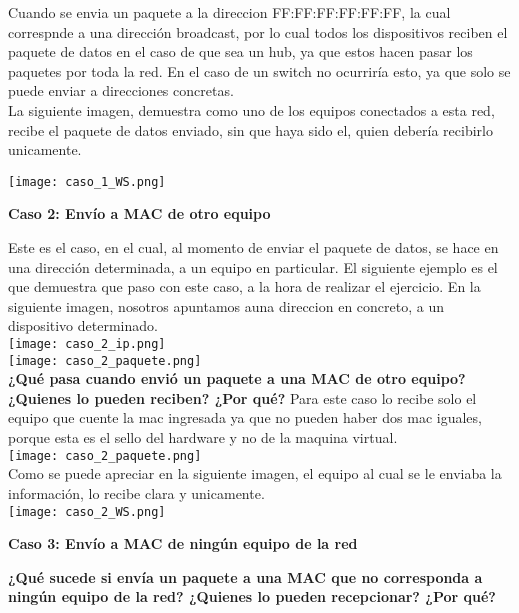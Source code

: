 \documentclass{article}
\begin{document}
Cuando se envia un paquete a la direccion  FF:FF:FF:FF:FF:FF, la cual correspnde a una dirección broadcast, por lo cual todos los dispositivos reciben el paquete de datos en el caso de que sea un hub, ya que estos hacen pasar los paquetes por toda la red. En el caso de un switch no ocurriría esto, ya que solo se puede enviar a direcciones concretas. \\
La siguiente imagen, demuestra como uno de los equipos conectados a esta red, recibe el paquete de datos enviado, sin que haya sido el, quien debería recibirlo unicamente.

\texttt{[image: caso\_1\_WS.png]}
\newpage
\begin{center}
{\LARGE \bfseries Caso 2: Envío a MAC de otro equipo }
\end{center}
Este es el caso, en el cual, al momento de enviar el paquete de datos, se hace en una dirección determinada, a un equipo en particular. El siguiente ejemplo es el que demuestra que paso con este caso, a la hora de realizar el ejercicio. En la siguiente imagen, nosotros apuntamos auna direccion en concreto, a un dispositivo determinado.\\
\texttt{[image: caso\_2\_ip.png]}
\\ 
\texttt{[image: caso\_2\_paquete.png]}
\\
\textbf{¿Qué pasa cuando envió un paquete a una MAC de otro equipo? ¿Quienes lo
pueden reciben? ¿Por qué?}
Para este caso lo recibe solo el equipo que cuente la mac ingresada ya que no pueden haber dos mac iguales, porque esta es el sello del hardware y no de la maquina virtual. \\

\texttt{[image: caso\_2\_paquete.png]}
\\ 
Como se puede apreciar en la siguiente imagen, el equipo al cual se le enviaba la información, lo recibe clara y unicamente. \\

\texttt{[image: caso\_2\_WS.png]}
\newpage
\begin{center}
{\LARGE \bfseries Caso 3: Envío a MAC de ningún equipo de la red }
\end{center}
\textbf{¿Qué sucede si envía un paquete a una MAC que no corresponda a ningún equipo
de la red? ¿Quienes lo pueden recepcionar? ¿Por qué?}
\end{document}
